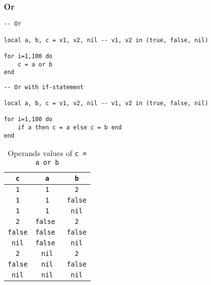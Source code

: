 \subsubsection{Or}

\begin{mdframed}[style=LuaStyleFrame]
\begin{lstlisting}[style=LuaStyle]
-- Or

local a, b, c = v1, v2, nil -- v1, v2 in (true, false, nil)

for i=1,100 do
 	c = a or b
end
\end{lstlisting}
\end{mdframed}

\begin{mdframed}[style=LuaStyleFrame]
\begin{lstlisting}[style=LuaStyle]
-- Or with if-statement

local a, b, c = v1, v2, nil -- v1, v2 in (true, false, nil)

for i=1,100 do
 	if a then c = a else c = b end
end
\end{lstlisting}
\end{mdframed}

\begin{table}[H]
    \centering
    \begin{tabular}{|c|c|c|}
        \hline
        \texttt{c} & \texttt{a} & \texttt{b} \\
        \hline
        \texttt{  1  } & \texttt{  1   } & \texttt{  2  } \\
        \texttt{  1  } & \texttt{  1   } & \texttt{false} \\
        \texttt{  1  } & \texttt{  1   } & \texttt{ nil } \\
        \texttt{  2  } & \texttt{false } & \texttt{  2  } \\
        \texttt{false} & \texttt{false } & \texttt{false} \\
        \texttt{ nil } & \texttt{false } & \texttt{ nil } \\
        \texttt{  2  } & \texttt{ nil  } & \texttt{  2  } \\
        \texttt{false} & \texttt{ nil  } & \texttt{false} \\
        \texttt{ nil } & \texttt{ nil  } & \texttt{ nil } \\
        \hline
    \end{tabular}
    \caption{Operands values of \texttt{c = a or b}}
    \label{tab:or-transformation}
\end{table}



